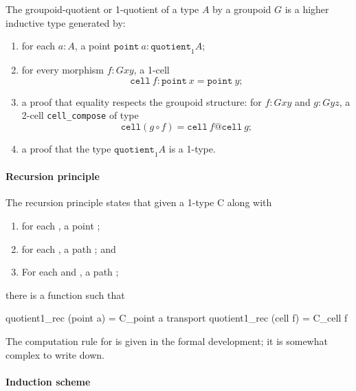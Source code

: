 \documentclass{article}
\begin{document}
The groupoid-quotient or 1-quotient of a type $A$ by a groupoid $G$ is a higher
inductive type generated by: 
\begin{enumerate}
    \item for each $a : A$, a point $\mathtt{point}~a : \mathtt{quotient}_1 A$;
    \item for every morphism $f : G x y$, a 1-cell
      \[\mathtt{cell}~f : \mathtt{point}~x = \mathtt{point}~y;\]
    \item a proof that equality respects the groupoid structure:
        for $f : G x y$ and $g : G y z$, a 2-cell \texttt{cell\_compose} of type
      \[ \mathtt{cell}(g ∘ f) = \mathtt{cell}~f @ \mathtt{cell}~g; \]
    \item a proof that the type $\mathtt{quotient}_1 A$ is a 1-type.
\end{enumerate}

\paragraph{Recursion principle}

The recursion principle states that given a 1-type C along with
\begin{enumerate}
    \item for each , a point ;
    \item for each , a path 
          ; and
    \item For each  and , a path
          ;
\end{enumerate}
there is a function  such that
\begin{haskell}
    quotient1_rec (point a) = C_point a
    transport quotient1_rec (cell f)  = C_cell f
\end{haskell}
The computation rule for  is given in the formal
development; it is somewhat complex to write down.

\paragraph{Induction scheme}
\end{document}

